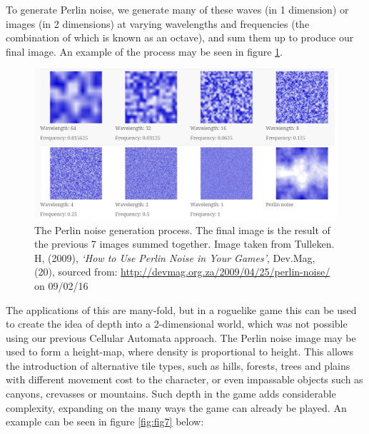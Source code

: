 \documentclass[12pt,a4paper]{article}
\begin{document}
To generate Perlin noise, we generate many of these waves (in 1 dimension) or images (in 2 dimensions) at varying wavelengths and frequencies (the combination of which is known as an octave), and sum them up to produce our final image. An example of the process may be seen in figure \ref{fig:fig6}.

\begin{figure}[h]
  \centering
 	\includegraphics[scale=0.65]{images/perlingen.png}
	\caption[]{The Perlin noise generation process. The final image is the result of the previous 7 images summed together. Image taken from Tulleken. H, (2009), \emph{`How to Use Perlin Noise in Your Games'}, Dev.Mag, (20), sourced from: \url{http://devmag.org.za/2009/04/25/perlin-noise/} on 09/02/16}
	\label{fig:fig6}
\end{figure}

The applications of this are many-fold, but in a roguelike game this can be used to create the idea of depth into a 2-dimensional world, which was not possible using our previous Cellular Automata approach. The Perlin noise image may be used to form a height-map, where density is proportional to height. This allows the introduction of alternative tile types, such as hills, forests, trees and plains with different movement cost to the character, or even impassable objects such as canyons, crevasses or mountains. Such depth in the game adds considerable complexity, expanding on the many ways the game can already be played. An example can be seen in figure \ref{fig:fig7} below:
\end{document}
